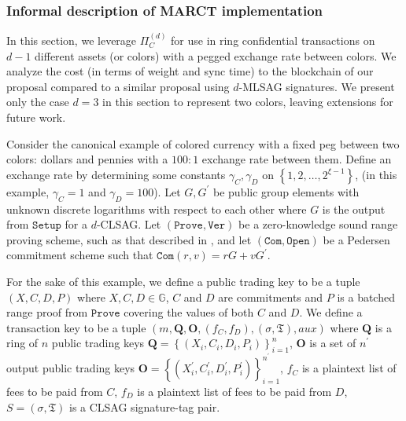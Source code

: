\documentclass{mrl}
\theoremstyle{plain}
\theoremstyle{definition}
\begin{document}
\subsubsection{Informal description of MARCT implementation}\label{ex:dualasset}

In this section, we leverage $\Pi_C^{(d)}$ for use in ring confidential transactions on $d-1$ different assets (or colors) with a pegged exchange rate between colors. We analyze the cost (in terms of weight and sync time) to the blockchain of our proposal compared to a similar proposal using $d$-MLSAG signatures. We present only the case $d=3$ in this section to represent two colors, leaving extensions for future work.

Consider the canonical example of colored currency with a fixed peg between two colors: dollars and pennies with a $100:1$ exchange rate between them. Define an exchange rate by determining some constants $\gamma_C, \gamma_D$ on $\left\{1, 2, \ldots, 2^{\xi - 1}\right\}$, (in this example, $\gamma_C = 1$ and $\gamma_D = 100$). Let $G, G^\prime$ be public group elements with unknown discrete logarithms with respect to each other where $G$ is the output from $\texttt{Setup}$ for a $d$-CLSAG.  Let $(\texttt{Prove}, \texttt{Ver})$ be a zero-knowledge sound range proving scheme, such as that described in \cite{bulletproofs}, and let $(\texttt{Com}, \texttt{Open})$ be a Pedersen commitment scheme such that $\texttt{Com}(r,v) = rG + v G^\prime$.

For the sake of this example, we define a public trading key to be a tuple $(X, C, D, P)$ where $X, C, D \in \mathbb{G}$, $C$ and $D$ are commitments and $P$ is a batched range proof from $\texttt{Prove}$ covering the values of both $C$ and $D$. We define a transaction key to be a tuple $(m, \textbf{Q}, \textbf{O}, (f_C, f_D), (\sigma, \mathfrak{T}), \textit{aux})$ where $\textbf{Q}$ is a ring of $n$ public trading keys  $\textbf{Q} = \left\{(X_i, C_i, D_i, P_i)\right\}_{i=1}^{n}$, $\textbf{O}$ is a set of $n^\prime$ output public trading keys $\textbf{O} = \left\{(X_i^\prime, C_i^\prime, D_i^\prime, P_i^\prime)\right\}_{i=1}^{n^\prime}$, $f_C$ is a plaintext list of fees to be paid from $C$, $f_D$ is a plaintext list of fees to be paid from $D$, $S=(\sigma, \mathfrak{T})$ is a CLSAG signature-tag pair.
\end{document}
